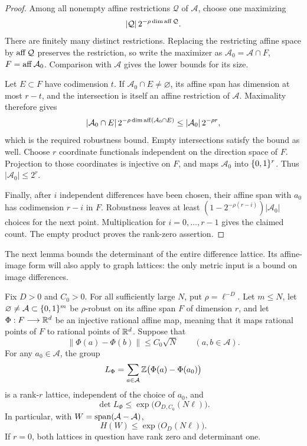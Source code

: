 \begin{proof}
Among all nonempty affine restrictions \(\mathcal Q\) of
\(\mathcal A\), choose one maximizing
\[
 |\mathcal Q|\,2^{-\rho\dim\operatorname{aff}\mathcal Q}.
\]
There are finitely many distinct restrictions. Replacing the
restricting affine space by \(\operatorname{aff}\mathcal Q\) preserves the
restriction, so write the maximizer as
\(\mathcal A_0=\mathcal A\cap F\), \(F=\operatorname{aff}\mathcal A_0\).
Comparison with \(\mathcal A\) gives the lower bounds for its size.

Let \(E\subset F\) have codimension \(t\). If
\(\mathcal A_0\cap E\ne\varnothing\), its affine span has dimension
at most \(r-t\), and the intersection is itself an affine
restriction of \(\mathcal A\). Maximality therefore gives
\[
 |\mathcal A_0\cap E|\,2^{-\rho\dim\operatorname{aff}(\mathcal A_0\cap E)}
 \le |\mathcal A_0|\,2^{-\rho r},
\]
which is the required robustness bound. Empty intersections satisfy
the bound as well. Choose \(r\) coordinate functionals independent
on the direction space of \(F\). Projection to those coordinates is
injective on \(F\), and maps \(\mathcal A_0\) into \(\{0,1\}^r\).
Thus \(|\mathcal A_0|\le2^r\).

Finally, after \(i\) independent differences have been chosen, their
affine span with \(a_0\) has codimension \(r-i\) in \(F\).
Robustness leaves at least
\((1-2^{-\rho(r-i)})|\mathcal A_0|\) choices for the next point.
Multiplication for \(i=0,\ldots,r-1\) gives the claimed count. The
empty product proves the rank-zero assertion.
\end{proof}

The next lemma bounds the determinant of the entire difference
lattice. Its affine-image form will also apply to graph lattices:
the only metric input is a bound on image differences.

\begin{lemma}\label{lem:robust-height}
Fix \(D>0\) and \(C_0>0\). For all sufficiently large \(N\), put
\(\rho=\ell^{-D}\). Let \(m\le N\), let
\(\varnothing\ne\mathcal A\subset\{0,1\}^m\) be \(\rho\)-robust on
its affine span \(F\) of dimension \(r\), and let
\(\Phi:F\longrightarrow\mathbb R^d\) be an injective rational affine map,
meaning that it maps rational points of \(F\) to rational points of
\(\mathbb R^d\). Suppose that
\[
 \|\Phi(a)-\Phi(b)\|\le C_0\sqrt N
       \qquad(a,b\in\mathcal A).
\]
For any \(a_0\in\mathcal A\), the group
\[
 L_\Phi=\sum_{a\in\mathcal A}\mathbb Z\bigl(\Phi(a)-\Phi(a_0)\bigr)
\]
is a rank-\(r\) lattice, independent of the choice of \(a_0\), and
\[
 \det L_\Phi\le \exp\bigl(O_{D,C_0}(N\ell)\bigr).
\]
In particular, with \(W=\operatorname{span}(\mathcal A-\mathcal A)\),
\[
 H(W)\le \exp\bigl(O_D(N\ell)\bigr).
\]
If \(r=0\), both lattices in question have rank zero and determinant
one.
\end{lemma}

